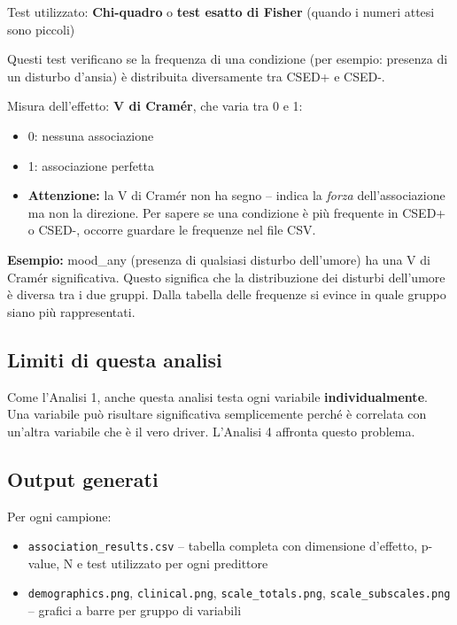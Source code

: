 \documentclass[12pt, a4paper]{article}
\begin{document}
Test utilizzato: \textbf{Chi-quadro} o \textbf{test esatto di Fisher} (quando i numeri
attesi sono piccoli)

Questi test verificano se la frequenza di una condizione (per esempio: presenza di un
disturbo d'ansia) è distribuita diversamente tra CSED+ e CSED-.

Misura dell'effetto: \textbf{V di Cramér}, che varia tra 0 e 1:
\begin{itemize}
    \item 0: nessuna associazione
    \item 1: associazione perfetta
    \item \textbf{Attenzione:} la V di Cramér non ha segno -- indica la \textit{forza}
          dell'associazione ma non la direzione. Per sapere se una condizione è più frequente
          in CSED+ o CSED-, occorre guardare le frequenze nel file CSV.
\end{itemize}

\textbf{Esempio:} mood\_any (presenza di qualsiasi disturbo dell'umore) ha una V di Cramér
significativa. Questo significa che la distribuzione dei disturbi dell'umore è diversa tra
i due gruppi. Dalla tabella delle frequenze si evince in quale gruppo siano più rappresentati.

\subsection{Limiti di questa analisi}

Come l'Analisi 1, anche questa analisi testa ogni variabile \textbf{individualmente}. Una
variabile può risultare significativa semplicemente perché è correlata con un'altra variabile
che è il vero driver. L'Analisi 4 affronta questo problema.

\subsection{Output generati}

Per ogni campione:
\begin{itemize}
    \item \texttt{association\_results.csv} -- tabella completa con dimensione d'effetto,
          p-value, N e test utilizzato per ogni predittore
    \item \texttt{demographics.png}, \texttt{clinical.png}, \texttt{scale\_totals.png},
          \texttt{scale\_subscales.png} -- grafici a barre per gruppo di variabili
\end{itemize}
\end{document}
